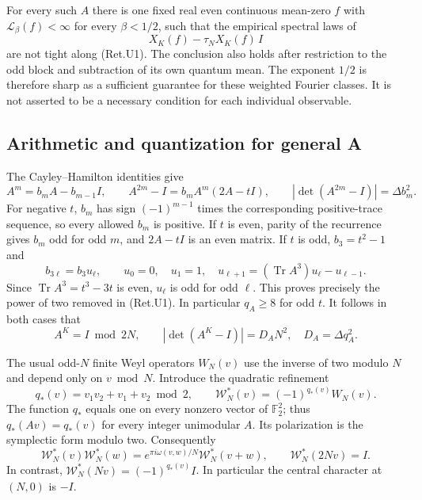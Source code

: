 \begin{theorem}\label{pass1:return_general-3} For every
such \(A\) there is one fixed real even continuous mean-zero \(f\) with
\(\mathcal L_\beta(f)<\infty\) for every \(\beta<1/2\), such that the
empirical spectral laws of
\[
             X_K(f)-\tau_N X_K(f)\,I                     \tag{Ret.U7}
\]
are not tight along (Ret.U1). The conclusion also holds after restriction
to the odd block and subtraction of its own quantum mean.
The exponent \(1/2\) is therefore sharp as a sufficient guarantee
for these weighted Fourier classes. It is not asserted to be a
necessary condition for each individual observable.
\end{theorem}

\hypertarget{arithmetic-and-quantization-for-general-a}{%
\subsection{Arithmetic and quantization for general A}\label{arithmetic-and-quantization-for-general-a}}

The Cayley--Hamilton identities give
\[
 A^m=b_mA-b_{m-1}I,\qquad
 A^{2m}-I=b_mA^m(2A-tI),\qquad
 |\det(A^{2m}-I)|=\Delta b_m^2.                           \tag{Ret.U8}
\]
For negative \(t\), \(b_m\) has sign \((-1)^{m-1}\) times the corresponding
positive-trace sequence, so every allowed \(b_m\) is positive.
If \(t\) is even, parity of the recurrence gives \(b_m\) odd for odd \(m\),
and \(2A-tI\) is an even matrix.
If \(t\) is odd, \(b_3=t^2-1\) and
\[
 b_{3\ell}=b_3 u_\ell,\qquad
 u_0=0,\quad u_1=1,\quad
 u_{\ell+1}=(\operatorname{Tr}A^3)u_\ell-u_{\ell-1}.
\]
Since \(\operatorname{Tr}A^3=t^3-3t\) is even, \(u_\ell\) is odd
for odd \(\ell\). This proves precisely the power of two removed
in (Ret.U1). In particular \(q_A\ge8\) for odd \(t\).
It follows in both cases that
\[
       A^K=I\bmod2N,\qquad
       |\det(A^K-I)|=D_A N^2,\quad D_A=\Delta q_A^2.       \tag{Ret.U9}
\]

The usual odd-\(N\) finite Weyl operators \(W_N(v)\) use the inverse
of two modulo \(N\) and depend only on \(v\bmod N\).
Introduce the quadratic refinement
\[
 q_*(v)=v_1v_2+v_1+v_2\bmod2,\qquad
 \mathcal W_N^*(v)=(-1)^{q_*(v)}W_N(v).                   \tag{Ret.U10}
\]
The function \(q_*\) equals one on every nonzero vector of
\(\mathbb F_2^2\); thus \(q_*(Av)=q_*(v)\) for every integer unimodular
\(A\). Its polarization is the symplectic form modulo two. Consequently
\[
 \mathcal W_N^*(v)\mathcal W_N^*(w)
       =e^{\pi i\omega(v,w)/N}\mathcal W_N^*(v+w),\qquad
 \mathcal W_N^*(2Nv)=I.                                  \tag{Ret.U11}
\]
In contrast, \(\mathcal W_N^*(Nv)=(-1)^{q_*(v)}I\).
In particular the central character at \((N,0)\) is \(-I\).

